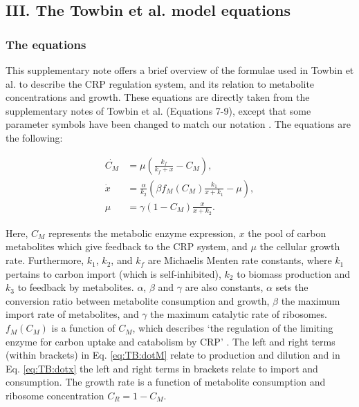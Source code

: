 

\subsection*{III. The Towbin et al. model equations}

\subsubsection*{The equations}

This supplementary note offers a brief overview of the formulae used in Towbin et al. to describe the CRP regulation system, and its relation to metabolite concentrations and growth.
%
These equations are directly taken from the supplementary notes of Towbin et al. (Equations 7-9), except that some parameter symbols have been changed to match our notation \cite{Towbin2017}.
%
The equations are the following:

\begin{align}
	\label{eq:TB:dotM}
	\dot{C_M} & = \mu ( \frac{k_f}{k_f+x} - C_M) ,\\
	\label{eq:TB:dotx}
	\dot{x} & = \frac{\alpha}{k_2} \left(    \beta f_M(C_M) \frac{k_1}{x+k_1}  -    \mu    \right) ,\\
	\label{eq:TB:mu}
	\mu & =\gamma(1-C_M) \frac{x}{x+k_2}
	.
\end{align}

Here, $C_M$ represents the metabolic enzyme expression, $x$ the pool of carbon metabolites which give feedback to the CRP system, and $\mu$ the cellular growth rate.
%
Furthermore, $k_1$, $k_2$, and $k_f$ are Michaelis Menten rate constants, where $k_1$ pertains to carbon import (which is self-inhibited), $k_2$ to biomass production and $k_3$ to feedback by metabolites.
%
$\alpha$, $\beta$ and $\gamma$ are also constants, 
$\alpha$ sets the conversion ratio between metabolite consumption and growth,
$\beta$ the maximum import rate of metabolites,
and $\gamma$ the maximum catalytic rate of ribosomes.
%
$f_M(C_M)$ is a function of $C_M$, which describes \lq{the regulation of the limiting enzyme for carbon uptake and catabolism by CRP}\rq{} \cite{Towbin2017}. 
%
The left and right terms (within brackets) in Eq. \ref{eq:TB:dotM} relate to production and dilution and in Eq. \ref{eq:TB:dotx} the left and right terms in brackets relate to import and consumption.
%
The growth rate is a function of metabolite consumption and ribosome concentration $C_R=1-C_M$.

